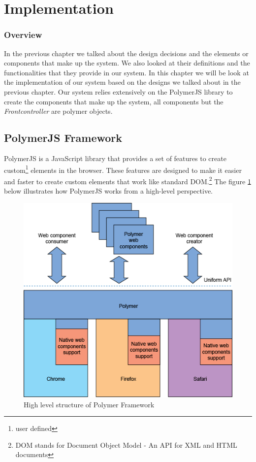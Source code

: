 \section{Implementation}
\subsubsection{Overview}
In the previous chapter we talked about the design decisions and the elements or components that make up the system. We also looked at their definitions and the functionalities that they provide in our system. In this chapter we will be look at the implementation of our system based on the designs we talked about in the previous chapter. Our system relies extensively on the PolymerJS library to create the components that make up the system, all components but the \emph{Frontcontroller} are polymer objects.
\subsection{PolymerJS Framework}
PolymerJS \cite{website:PolymerJS} is a JavaScript library that provides a set of features to create custom\footnote{user defined} elements in the browser. These features are designed to make it easier and faster to create custom elements that work like standard DOM.\footnote{DOM stands for Document Object Model - An API for XML and HTML documents} The figure \ref{fig:PolymerArch} below illustrates how PolymerJS works from a high-level perspective. 

\begin{figure}[!ht]
\caption{High level structure of Polymer Framework}
    \label{fig:PolymerArch}
    \centering
    \includegraphics[scale=0.5]{figures/PolymerJSArch}
\end{figure}

